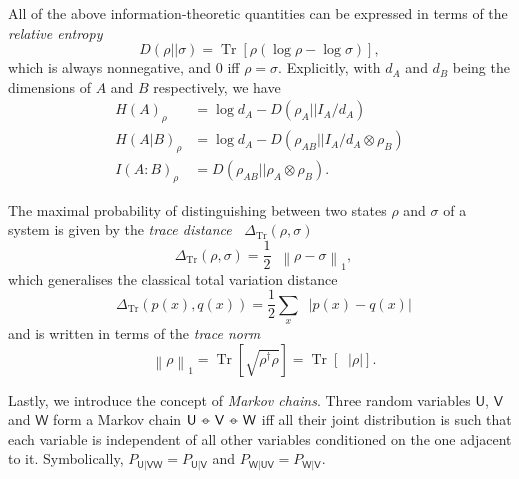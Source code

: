 \documentclass[10pt, a4paper]{article}
\numberwithin{equation}{section} %
\theoremstyle{definition}
\theoremstyle{plain}
\newcommand{\norm}[1]{\mathop{}\left\lVert#1\right\rVert}
\newcommand{\abs}[1]{\mathop{}\left\lvert#1\right\rvert}
\newcommand{\?}{\mathrel{?}} %
\newcommand*\markov{\mathrel{\ooalign{\hidewidth$\circ$\hidewidth\cr$-$\cr}}} %
\newcommand{\Tr}[2][]{\mathop{\mathrm{Tr}#1}\left[ #2 \right]} %
\newcommand{\Trdist}[2]{\mathop{}\Delta_\mathrm{Tr}\left(#1, #2\right)}
\newcommand{\crv}[1]{\mathsf{#1}}
\begin{document}
\begin{appendices}
                          All of the above information-theoretic quantities can be expressed in terms of the \emph{relative entropy}
                          \begin{equation}
                            D(\rho||\sigma) = \Tr{ \rho (\log \rho - \log \sigma) },
                          \end{equation}
                          which is always nonnegative, and 0 iff \(\rho = \sigma\). Explicitly, with \(d_A\) and \(d_B\) being the dimensions of \(A\) and \(B\) respectively, we have
                          \begin{align}
                            H{(A)}_{\rho} &= \log d_A - D(\rho_A || I_A/d_A) \\
                            H{(A|B)}_{\rho} &= \log d_A - D(\rho_{AB} || I_A/d_A \otimes \rho_B) \\
                            I{(A:B)}_{\rho} &= D(\rho_{AB} || \rho_A \otimes \rho_B).
                          \end{align}

                          The maximal probability of distinguishing between two states \(\rho\) and \(\sigma\) of a system is given by the \emph{trace distance} \(\Trdist{\rho}{\sigma}\) 
                          \begin{equation}
                            \Trdist{\rho}{\sigma} = \frac{1}{2}\norm{\rho - \sigma}_1,
                          \end{equation}
                          which generalises the classical total variation distance
                          \begin{equation} \Trdist{p(x)}{q(x)} = \frac{1}{2} \sum_{x} \abs{p(x)-q(x)} \end{equation}
                          and is written in terms of the \emph{trace norm}
                          \begin{equation}
                            \norm{\rho}_1 = \Tr{ \sqrt{\rho^{\dagger}\rho} } = \Tr{\abs{\rho}}.
                          \end{equation}

                          Lastly, we introduce the concept of \emph{Markov chains}. Three random variables \(\crv{U}\), \(\crv{V}\) and \(\crv{W}\) form a Markov chain \(\crv{U} \markov \crv{V} \markov \crv{W}\) iff all their joint distribution is such that each variable is independent of all other variables conditioned on the one adjacent to it. Symbolically, \(P_{\crv{U}|\crv{VW}} = P_{\crv{U}|\crv{V}}\) and \(P_{\crv{W}|\crv{UV}} = P_{\crv{W}|\crv{V}}\).


\end{appendices}
\end{document}
